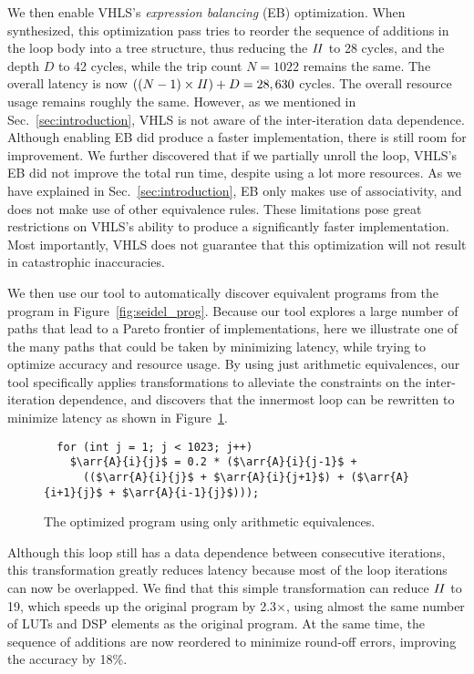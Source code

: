 We then enable VHLS's \emph{expression balancing} (EB) optimization.  When
synthesized, this optimization pass tries to reorder the sequence of additions
in the loop body into a tree structure, thus reducing the $\mathit{II}$ to 28 cycles,
and the depth $D$ to 42 cycles, while the trip count $N = 1022$ remains the
same.  The overall latency is now $((N-1) \times \mathit{II}) + D = 28,630$ cycles.
The overall resource usage remains roughly the same.  However, as we mentioned
in Sec.~\ref{sec:introduction}, VHLS is not aware of the inter-iteration data
dependence.  Although enabling EB did produce a faster implementation, there is
still room for improvement.  We further discovered that if we partially unroll
the loop, VHLS's EB did not improve the total run time, despite using a lot
more resources.  As we have explained in Sec.~\ref{sec:introduction}, EB only
makes use of associativity, and does not make use of other equivalence rules.
These limitations pose great restrictions on VHLS's ability to produce a
significantly faster implementation.  Most importantly, VHLS does not guarantee
that this optimization will not result in catastrophic inaccuracies.

We then use our tool to automatically discover equivalent programs from
the program in Figure~\ref{fig:seidel_prog}.  Because our tool explores a
large number of paths that lead to a Pareto frontier of implementations,
here we illustrate one of the many paths that could be taken by minimizing
latency, while trying to optimize accuracy and resource usage.  By using just
arithmetic equivalences, our tool specifically applies transformations to
alleviate the constraints on the inter-iteration dependence, and discovers
that the innermost loop can be rewritten to minimize latency as shown in
Figure~\ref{fig:seidel_prog_2}.

\begin{figure}[ht]
\begin{lstlisting}
  for (int j = 1; j < 1023; j++)
    $\arr{A}{i}{j}$ = 0.2 * ($\arr{A}{i}{j-1}$ +
      (($\arr{A}{i}{j}$ + $\arr{A}{i}{j+1}$) + ($\arr{A}{i+1}{j}$ + $\arr{A}{i-1}{j}$)));
\end{lstlisting}
    \caption{The optimized program using only arithmetic equivalences.}
    \label{fig:seidel_prog_2}
\end{figure}

Although this loop still has a data dependence between consecutive iterations,
this transformation greatly reduces latency because most of the loop iterations
can now be overlapped.  We find that this simple transformation can reduce
$\mathit{II}$ to 19, which speeds up the original program by 2.3$\times$, using almost
the same number of LUTs and DSP elements as the original program.  At the same
time, the sequence of additions are now reordered to minimize round-off errors,
improving the accuracy by 18\%.

